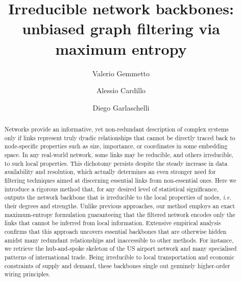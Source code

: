 \documentclass[aps,twocolumn,superscriptaddress]{revtex4-1}
\newcommand{\ie}{\emph{i.e.} }
\begin{document}
\title{Irreducible network backbones:\\ unbiased graph filtering via maximum entropy}

\author{Valerio Gemmetto}


\author{Alessio Cardillo}


\author{Diego Garlaschelli}



\begin{abstract}
Networks provide an informative, yet non-redundant description of complex systems only if links represent truly dyadic relationships that cannot be directly traced back to node-specific properties such as size, importance, or coordinates in some embedding space. 
In any real-world network, some links may be reducible, and others irreducible, to such local properties.
This dichotomy persists despite the steady increase in data availability and resolution, which actually determines an even stronger need for filtering techniques aimed at discerning essential links from non-essential ones.
Here we introduce a rigorous method that, for any desired level of statistical significance, outputs the network backbone that is irreducible to the local properties of nodes, \ie their degrees and strengths. 
Unlike previous approaches, our method employs an exact maximum-entropy formulation guaranteeing that the filtered network encodes only the links that cannot be inferred from local information.
Extensive empirical analysis confirms that this approach uncovers essential backbones that are otherwise hidden amidst many redundant relationships and inaccessible to other methods. 
For instance, we retrieve the hub-and-spoke skeleton of the US airport network and many specialised patterns of international trade. 
Being irreducible to local transportation and economic constraints of supply and demand, these backbones single out genuinely higher-order wiring principles.
\end{abstract}
\end{document}
